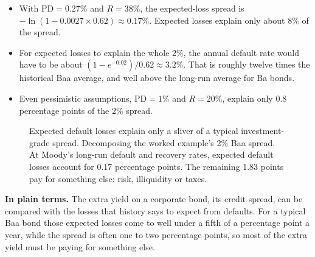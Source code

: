 \begin{itemize}
  \item With $\mathrm{PD} = 0.27\%$ and $R = 38\%$, the expected-loss spread is $-\ln(1 - 0.0027 \times 0.62) \approx 0.17\%$. Expected losses explain only about 8\% of the spread.
  \item For expected losses to explain the whole 2\%, the annual default rate would have to be about $(1 - e^{-0.02})/0.62 \approx 3.2\%$. That is roughly twelve times the historical Baa average, and well above the long-run average for Ba bonds.
  \item Even pessimistic assumptions, $\mathrm{PD} = 1\%$ and $R = 20\%$, explain only 0.8 percentage points of the 2\% spread.
\end{itemize}

\begin{figure}[htbp]
\centering
{}
\caption{Expected default losses explain only a sliver of a typical investment-grade spread. Decomposing the worked example's 2\% Baa spread. At Moody's long-run default and recovery rates, expected default losses account for 0.17 percentage points. The remaining 1.83 points pay for something else: risk, illiquidity or taxes.}
\label{fig:15-decomp}
\end{figure}

\noindent\textbf{In plain terms.} The extra yield on a corporate bond, its credit spread, can be compared with the losses that history says to expect from defaults. For a typical Baa bond those expected losses come to well under a fifth of a percentage point a year, while the spread is often one to two percentage points, so most of the extra yield must be paying for something else.

